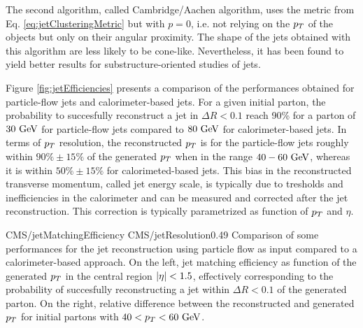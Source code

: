         The second algorithm, called Cambridge/Aachen algorithm, uses the metric from Eq.
        \ref{eq:jetClusteringMetric} but with $p = 0$, i.e. not relying on the $p_T$ of
        the objects but only on their angular proximity. The shape of the jets obtained with
        this algorithm are less likely to be cone-like. Nevertheless, it has been found to
        yield better results for substructure-oriented studies of jets.

        Figure \ref{fig:jetEfficiencies} presents a comparison of the performances obtained
        for particle-flow jets and calorimeter-based jets. For a given initial parton, the
        probability to succesfully reconstruct a jet in $\Delta R < 0.1$ reach 90\% for
        a parton of $30~\text{GeV}$ for particle-flow jets compared to $80~\text{GeV}$ for
        calorimeter-based jets. In terms of $p_T$ resolution, the reconstructed $p_T$ is
        for the particle-flow jets roughly within $90\% \pm 15\%$ of the generated $p_T$
        when in the range $40-60~\text{GeV}$, whereas it is within $50\% \pm 15\%$ for
        calorimeted-based jets. This bias in the reconstructed transverse momentum, called
        jet energy scale, is typically due to tresholds and inefficiencies in the calorimeter
        and can be measured and corrected after the jet reconstruction. This correction is
        typically parametrized as function of $p_T$ and $\eta$.


        {CMS/jetMatchingEfficiency}
        {CMS/jetResolution}{0.49}
        {Comparison of some performances for the jet reconstruction using particle flow as
        input compared to a calorimeter-based approach. On the left, jet matching efficiency
        as function of the generated $p_T$ in the central region $\left| \eta \right| < 1.5$, effectively
        corresponding to the probability of succesfully reconstructing a jet within
        $\Delta R < 0.1$ of the generated parton. On the right, relative difference between
        the reconstructed and generated $p_T$ for initial partons with $40 < p_T < 60~\text{GeV}$.}

